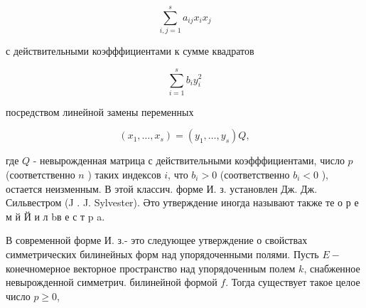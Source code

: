 \documentclass[10pt]{article}
\begin{document}
\[

\sum_{i, j=1}^{s} a_{i j} x_{i} x_{j}

\]



с действительными коэфффициентами к сумме квадратов



\[

\sum_{i=1}^{s} b_{i} y_{i}^{2}

\]



посредством линейной замены переменных



\[

\left(x_{1}, \ldots, x_{s}\right)=\left(y_{1}, \ldots, y_{s}\right) Q,

\]



где $Q$ - невырожденная матрица с действительными коэфффициентами, число $p$ (соответственно $n$ ) таких индексов $i$, что $b_{i}>0$ (соответственно $b_{i}<0$ ), остается неизменным. В этой классич. форме И. з. установлен Дж. Дж. Сильвестром (J . J. Sylvester). Әто утверждение иногда называют также те о р е м й Й и л bв е с т p a.



В современной форме И. з.- это следующее утверждение о свойствах симметрических билинейных форм над упорядоченными полями. Пусть $E-$ конечномерное векторное пространство над упорядоченным полем $k$, снабженное невырожденной симметрич. билинейной формой $f$. Тогда существует такое целое число $p \geqslant 0$,
\end{document}

